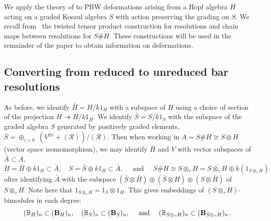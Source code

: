 \documentclass[11pt]{amsart}
\numberwithin{equation}{section}
\newcommand{\R}{\mathcal{R}}
\newcommand{\B}{{\bf B}} %
\newcommand{\BB}{\mathbb{B}} %
\newcommand{\ttp}{S \ot_{\tau} \Ho}
\newcommand{\ttpp}{(\ttp)}%
\renewcommand{\_}[1]{\mbox{$_{\left( #1 \right)}$}}
\newcommand{\ot}{\otimes}
\newcommand{\ott}{\otimes_{\tau}}
\newcommand{\Ho}{H}%
\begin{document}
{We apply the theory of \cite{TTP-AWEZ} to PBW deformations arising
from a Hopf algebra $H$ acting on a graded Koszul algebra $S$
with action preserving the grading on $S$.
We recall from~\cite{SW-twisted,TTP-AWEZ} the twisted tensor product
construction for resolutions and chain maps between resolutions for
$S\# H$. 
These constructions will be used in the remainder of the paper to obtain
information on deformations. 


\subsection*{Converting from 
  reduced to unreduced bar resolutions}
As before, we identify 
$\bar{\Ho}=H/k1_H$ with a subspace of $H$ using a choice of section of
the projection $H\twoheadrightarrow  H/ k1_H$.
We identify $\bar S=S/k1_S$ with the subspace of the graded
algebra $S$
generated by positively graded elements, $\bar S = \oplus_{i>0} \
(V^{\ot i}+(\R))/(\R)$.
Then when working in $A=S\#H\cong S\ot H$ (vector space isomomorphism),
we may identify $\bar H$ and $V$ with vector subspaces of $\bar A\subset A$,
\begin{equation}
  \label{ChoiceOfSection}
  \Ho=\bar{\Ho}\oplus k1_\Ho \subset \bar A,\quad
  S=\bar{S}\oplus k1_\Ho\subset \bar A,
  \quad\text{ and }\quad
  S\# H\cong \ttp=\overline{\ttp}\oplus k(1_{S\ott H})
\end{equation}
after identifying $\bar A$ with the subspace
$(\bar S\ot \bar H)\oplus (\bar S \ot H)\oplus (S\ot 
\bar H)$ of $\ttp$.
%
Note here that $1_{\ttp}=1_S \ot 1_H$.
This gives embeddings of $\ttpp$-bimodules in each degree:
$$(\BB_\Ho)_n\subset (\B_\Ho)_n,\quad
(\BB_S)_n\subset (\B_S)_n, 
\quad\text{ and }\quad
(\BB_{\ttp})_n \subset (\B_{\ttp})_n
\, .
$$
%

}
\end{document}
